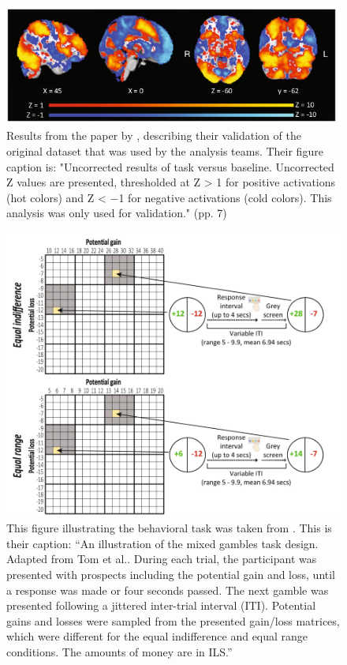 \begin{figure}[!ht]
    \includegraphics[width=\textwidth]
    {figures/botvinik-nezer_fig4.png}
    \caption{\label{fig:orig_bot} Results from the paper by \cite{botvinik-nezer_fmri_2019}, describing their validation of the original dataset that was used by the analysis teams. Their figure caption is: "Uncorrected results of task versus baseline. Uncorrected Z values are presented, thresholded at Z > 1 for positive activations (hot colors) and Z < −1 for negative activations (cold colors). This analysis was only used for validation." (pp. 7)}
\end{figure}


\begin{figure}[!ht]
    \includegraphics[width=\textwidth]{figures/botvinik-nezer_fig1.png}
    \caption{\label{fig:task} This figure illustrating the behavioral task was taken from \cite{botvinik-nezer_fmri_2019}. This is their caption: ``An illustration of the mixed gambles task design. Adapted from Tom et al.. During each trial, the participant was presented with prospects including the potential gain and loss, until a response was made or four seconds passed. The next gamble was presented following a jittered inter-trial interval (ITI). Potential gains and losses were sampled from the presented gain/loss matrices, which were different for the equal indifference and equal range conditions. The amounts of money are in ILS.''}
\end{figure}






